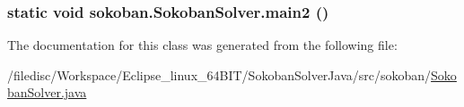\hypertarget{classsokoban_1_1SokobanSolver_23fe5693f4702b6e7d46e155d00555d0}{
\subsubsection[{main2}]{\setlength{\rightskip}{0pt plus 5cm}static void sokoban.SokobanSolver.main2 ()}}
\label{classsokoban_1_1SokobanSolver_23fe5693f4702b6e7d46e155d00555d0}




The documentation for this class was generated from the following file:\begin{CompactItemize}
\item 
/filedisc/Workspace/Eclipse\_\-linux\_\-64BIT/SokobanSolverJava/src/sokoban/\hyperlink{SokobanSolver_8java}{SokobanSolver.java}\end{CompactItemize}
